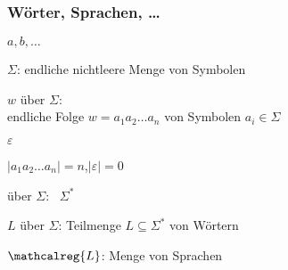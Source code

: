     \begin{frame}
      \frametitle{Wörter, Sprachen, \dots}
      
      \begin{Itemize}
        \item
           $a,b,\dots$
        \item
           $\Sigma$: endliche nichtleere Menge von Symbolen
        \item
           $w$ über $\Sigma$:\\
          endliche Folge $w = a_1a_2\dots a_n$ von Symbolen $a_i \in \Sigma$
        \item
           $\varepsilon$
        \item
           $|a_1a_2\dots a_n| = n$,\quad $|\varepsilon| = 0$
        \item
           über $\Sigma$:~ $\Sigma^*$
        \item
           $L$ über $\Sigma$: Teilmenge $L \subseteq \Sigma^*$ von Wörtern
        \item
           $\mathcalreg{L}$: Menge von Sprachen
      \end{Itemize}

    \end{frame}

